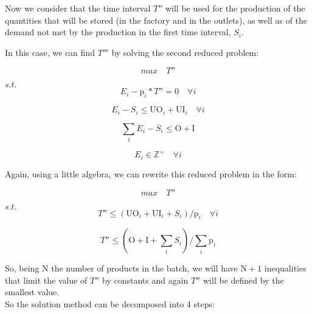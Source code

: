 \documentclass[preprint,12pt,authoryear]{elsarticle}
\begin{document}
Now we consider that the time interval $T''$ will be used for the production of the quantities that will be stored (in the factory and in the outlets), as well as of the demand not met by the production in the first time interval, $S_i$. 

In this case, we can find $T'''$ by solving the second reduced problem:

\begin{equation}
max \quad T''
\end{equation}

$s.t.$ \\

\begin{equation}
E_i - \textrm{p}_i * T''  = 0 \quad \forall i
\end{equation}

\begin{equation}
E_i - S_i \leq \textrm{UO}_i + \textrm{UI}_i \quad \forall i
\end{equation}

\begin{equation}
\sum_i {E_i - S_i} \leq \textrm{O} + \textrm{I}
\end{equation}

\begin{equation}
E_i \in  \mathbb{Z}^+ \quad \forall i
\end{equation}

Again, using a little algebra, we can rewrite this reduced problem in the form:

\begin{equation}
max \quad T''
\end{equation}

$s.t.$ \\

\begin{equation}
T'' \leq (\textrm{UO}_i + \textrm{UI}_i + S_i) / \textrm{p}_i  \quad \forall i
\end{equation}

\begin{equation}
T'' \leq (\textrm{O} + \textrm{I} + \sum_i {S_i}) / \sum_i {\textrm{p}_i}
\end{equation}

So, being $\textrm{N}$ the number of products in the batch, we will have $\textrm{N}+1$ inequalities that limit the value of $T''$ by constants and again $T''$ will be defined by the smallest value. \\

So the solution method can be decomposed into 4 steps: \\
\end{document}
